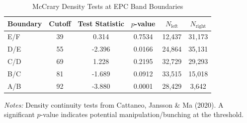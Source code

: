 \begin{table}[htbp]
\centering
\caption{McCrary Density Tests at EPC Band Boundaries}
\label{tab:mccrary}
\begin{tabular}{lccccc}
\toprule
Boundary & Cutoff & Test Statistic & $p$-value & $N_{\text{left}}$ & $N_{\text{right}}$ \\
\midrule
E/F & 39 & 0.314 & 0.7534 & 12,437 & 31,173 \\
D/E & 55 & -2.396 & 0.0166 & 24,864 & 35,131 \\
C/D & 69 & 1.228 & 0.2195 & 32,729 & 29,293 \\
B/C & 81 & -1.689 & 0.0912 & 33,515 & 15,018 \\
A/B & 92 & -3.880 & 0.0001 & 28,429 & 3,642 \\
\bottomrule
\end{tabular}
\begin{minipage}{\textwidth}
\footnotesize
\textit{Notes:} Density continuity tests from Cattaneo, Jansson \& Ma (2020).
A significant $p$-value indicates potential manipulation/bunching at the threshold.
\end{minipage}
\end{table}
